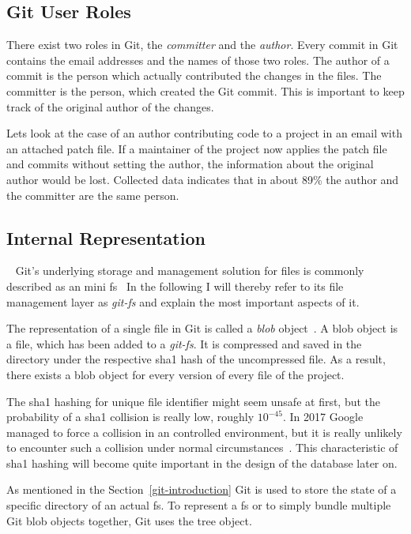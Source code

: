 \subsection{Git User Roles}
There exist two roles in Git, the \emph{committer} and the \emph{author}.
Every commit in Git contains the email addresses and the names of those two roles.
The author of a commit is the person which actually contributed the changes in the files.
The committer is the person, which created the Git commit.
This is important to keep track of the original author of the changes.

Lets look at the case of an author contributing code to a project in an email with an attached patch file.
If a maintainer of the project now applies the patch file and commits without setting the author, the information about the original author would be lost.
Collected data indicates that in about 89\% the author and the committer are the same person.


\subsection{Internal Representation}~\label{git-internal-representation}
Git's underlying storage and management solution for files is commonly described as an mini \ac{fs}~\cite[p.~9]{book:pro-git}
In the following I will thereby refer to its file management layer as \emph{git-fs} and explain the most important aspects of it.

The representation of a single file in Git is called a \emph{blob} object~\cite[p.~56]{book:pro-git}.
A blob object is a file, which has been added to a \emph{git-fs}.
It is compressed and saved in the  directory under the respective \ac{sha1} hash of the uncompressed file.
As a result, there exists a blob object for every version of every file of the project.

The \ac{sha1} hashing for unique file identifier might seem unsafe at first, but the probability of a \ac{sha1} collision is really low, roughly $10^{-45}$.
In 2017 Google managed to force a collision in an controlled environment, but it is really unlikely to encounter such a collision under normal circumstances~\cite{techreport:sha-collision}.
This characteristic of \ac{sha1} hashing will become quite important in the design of the database later on.

As mentioned in the Section~\ref{git-introduction} Git is used to store the state of a specific directory of an actual \ac{fs}.
To represent a \ac{fs} or to simply bundle multiple Git blob objects together, Git uses the tree object.

